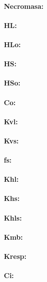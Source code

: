\paragraph{Necromasa:}
\paragraph{HL:}
\paragraph{HLo:}
\paragraph{HS:}
\paragraph{HSo:}
\paragraph{Co:}
\paragraph{Kvl:}
\paragraph{Kvs:}
\paragraph{fs:}
\paragraph{Khl:}
\paragraph{Khs:}
\paragraph{Khls:}
\paragraph{Kmb:}
\paragraph{Kresp:}
\paragraph{Ci:}

